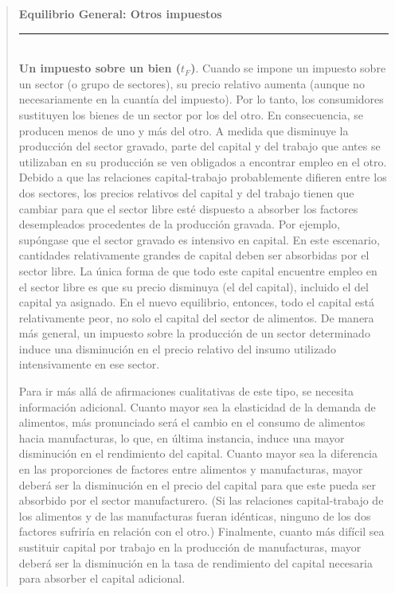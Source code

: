 \documentclass[10pt,a4paper]{article}
\newenvironment{specialblock}[1]{%
      \begin{quote} %
      \small %
      \noindent\textbf{#1}\\[-0.3em] %
      \rule{\linewidth}{0.4pt}\\[0.6em]}{
      \end{quote}}
\begin{document}
\begin{specialblock}{Equilibrio General: Otros impuestos}
    \textbf{Un impuesto sobre un bien ($t_F$)}. Cuando se impone un impuesto sobre un sector (o grupo de sectores), su precio relativo aumenta (aunque no necesariamente en la cuantía del impuesto). Por lo tanto, los consumidores sustituyen los bienes de un sector por los del otro. En consecuencia, se producen menos de uno y más del otro. A medida que disminuye la producción del sector gravado, parte del capital y del trabajo que antes se utilizaban en su producción se ven obligados a encontrar empleo en el otro. Debido a que las relaciones capital-trabajo probablemente difieren entre los dos sectores, los precios relativos del capital y del trabajo tienen que cambiar para que el sector libre esté dispuesto a absorber los factores desempleados procedentes de la producción gravada. Por ejemplo, supóngase que el sector gravado es intensivo en capital. En este escenario, cantidades relativamente grandes de capital deben ser absorbidas por el sector libre. La única forma de que todo este capital encuentre empleo en el sector libre es que su precio disminuya (el del capital), incluido el del capital ya asignado. En el nuevo equilibrio, entonces, todo el capital está relativamente peor, no solo el capital del sector de alimentos. De manera más general, un impuesto sobre la producción de un sector determinado induce una disminución en el precio relativo del insumo utilizado intensivamente en ese sector.

    Para ir más allá de afirmaciones cualitativas de este tipo, se necesita información adicional. Cuanto mayor sea la elasticidad de la demanda de alimentos, más pronunciado será el cambio en el consumo de alimentos hacia manufacturas, lo que, en última instancia, induce una mayor disminución en el rendimiento del capital. Cuanto mayor sea la diferencia en las proporciones de factores entre alimentos y manufacturas, mayor deberá ser la disminución en el precio del capital para que este pueda ser absorbido por el sector manufacturero. (Si las relaciones capital-trabajo de los alimentos y de las manufacturas fueran idénticas, ninguno de los dos factores sufriría en relación con el otro.) Finalmente, cuanto más difícil sea sustituir capital por trabajo en la producción de manufacturas, mayor deberá ser la disminución en la tasa de rendimiento del capital necesaria para absorber el capital adicional.
    

\end{specialblock}
\end{document}
